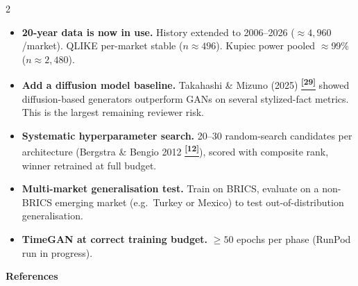 \documentclass[10pt]{article}
\newcommand{\amberbox}[2]{\begin{tcolorbox}[mybox={Amber}{ABg},title={#1}]#2\end{tcolorbox}}
\newcommand{\tcite}[1]{%
  \hyperlink{R:#1}{\textsuperscript{\scriptsize\textbf{[#1]}}}}
\begin{document}
\begin{multicols}{2}
\amberbox{Future Work}{%
\begin{itemize}
  \item \textbf{20-year data is now in use.} History extended to 2006--2026 ($\approx4{,}960$/market). QLIKE per-market stable ($n\approx496$). Kupiec power pooled $\approx$99\% ($n\approx2{,}480$).
  \item \textbf{Add a diffusion model baseline.} Takahashi \& Mizuno (2025)\tcite{29} showed diffusion-based generators outperform GANs on several stylized-fact metrics. This is the largest remaining reviewer risk.
  \item \textbf{Systematic hyperparameter search.} 20--30 random-search candidates per architecture (Bergstra \& Bengio 2012\tcite{12}), scored with composite rank, winner retrained at full budget.
  \item \textbf{Multi-market generalisation test.} Train on BRICS, evaluate on a non-BRICS emerging market (e.g.\ Turkey or Mexico) to test out-of-distribution generalisation.
  \item \textbf{TimeGAN at correct training budget.} $\geq 50$ epochs per phase (RunPod run in progress).
\end{itemize}}

\end{multicols}

\clearpage

\begin{tcolorbox}[
  colback=NavyBg, colframe=NavyBg!60!black, arc=4pt,
  left=8pt, right=8pt, top=4pt, bottom=4pt,
  before skip=0pt, after skip=10pt]
{\large\bfseries\color{Navy} References}
\end{tcolorbox}
\end{document}
